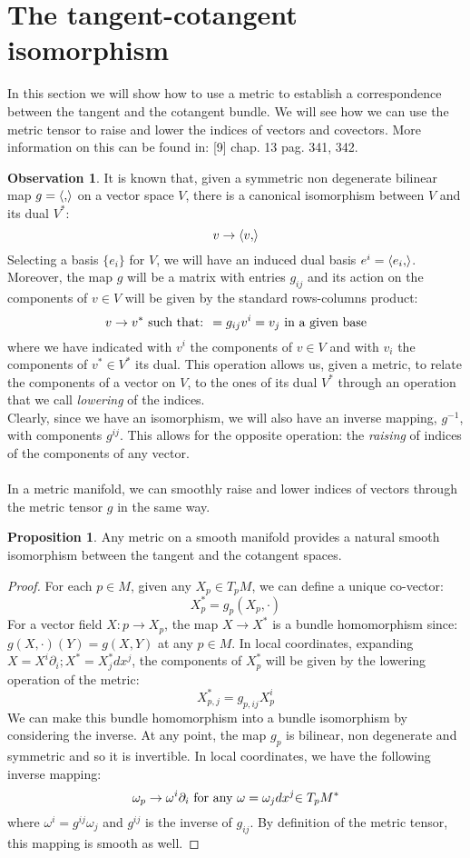 \documentclass[12pt,a4paper]{report}
\theoremstyle{definition}
\theoremstyle{Theorem}
\newtheorem{Prop}[Def]{Proposition}
\theoremstyle{definition}
\theoremstyle{definition}
\newtheorem{Obs}[Def]{Observation}
\begin{document}
	\section{The tangent-cotangent isomorphism}\label{Sec_3.3}
	In this section we will show how to use a metric to establish a correspondence between the tangent and the cotangent bundle. We will see how we can use the metric tensor to raise and lower the indices of vectors and covectors. More information on this can be found in: [9] chap. 13 pag. 341, 342.
	\begin{Obs}
		It is known that, given a symmetric non degenerate bilinear map $g=\braket{,}$ on a vector space $V$, there is a canonical isomorphism between $V$ and its dual $V^*$:
		$$v\rightarrow\braket{v,}$$
		Selecting a basis $\{e_i\}$ for $V$, we will have an induced dual basis $e^i=\braket{e_i,}$. Moreover, the map $g$ will be a matrix with entries $g_{ij}$ and its action on the components of $v\in V$ will be given by the standard rows-columns product:
		$$v\rightarrow
		v^*\hbox{ such that: }=g_{ij}v^i=v_j \hbox{ in a given base}$$
		where we have indicated with $v^i$ the components of $v\in V$ and with $v_i$ the components of $v^*\in V^*$ its dual. This operation allows us, given a metric, to relate the components of a vector on $V$, to the ones of its dual $V^*$ through an operation that we call \textit{lowering} of the indices.\\
		Clearly, since we have an isomorphism, we will also have an inverse mapping, $g^{-1}$, with components $g^{ij}$. This allows for the opposite operation: the \textit{raising} of indices of the components of any vector.\\
		\\
		In a metric manifold, we can smoothly raise and lower indices of vectors through the metric tensor $g$ in the same way.
	\end{Obs}
	\begin{Prop}
		Any metric on a smooth manifold provides a natural smooth isomorphism between the tangent and the cotangent spaces.
	\end{Prop}
	\begin{proof}
		For each $p\in M$, given any $X_p\in T_pM$, we can define a unique co-vector: 
		$$X^*_p=g_p(X_p,\cdot)$$
		For a vector field $X:p\rightarrow X_p$, the map $X\rightarrow X^*$ is a bundle homomorphism since: $g(X,\cdot )(Y)=g(X,Y)$ at any $p\in M$.
		In local coordinates, expanding $X=X^i\partial_i;X^*=X^*_jdx^j$, the components of $X^*_p$ will be given by the lowering operation of the metric:
		$$X^*_{p,j}=g_{p,ij}X_p^i$$
		We can make this bundle homomorphism into a bundle isomorphism by considering the inverse. At any point, the map $g_p$ is bilinear, non degenerate and symmetric and so it is invertible. In local coordinates, we have the following inverse mapping:
		$$\omega_p\rightarrow\omega^i\partial_i\hbox{ for any }\omega=\omega_jdx^j{\in T_pM^*}$$
		where $\omega^i=g^{ij}\omega_j$ and $g^{ij}$ is the inverse of $g_{ij}$. By definition of the metric tensor, this mapping is smooth as well. 
	\end{proof}
\end{document}
